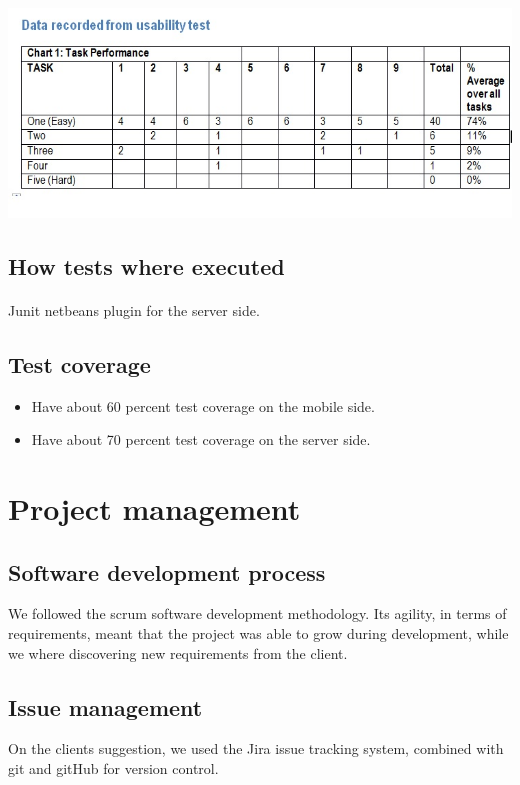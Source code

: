 \documentclass[10pt,a4paper]{article}
\begin{document}
\paragraph{}
\includegraphics[scale=0.55]{Pictures/results.jpg}
\subsection{How tests where executed}
\paragraph{}
Junit netbeans plugin for the server side.
\subsection{Test coverage}
\begin{itemize}
\item Have about 60 percent test coverage on the mobile side.
\item Have about 70 percent test coverage on the server side. 
\end{itemize}

\section{Project management}
\subsection{Software development process}
We followed the scrum software development methodology. Its agility, in terms of requirements, meant that the project was able to grow during development, while we where discovering new requirements from the client.
\subsection{Issue management}
On the clients suggestion, we used the Jira issue tracking system, combined with git and gitHub for version control.
\pagebreak
\end{document}
